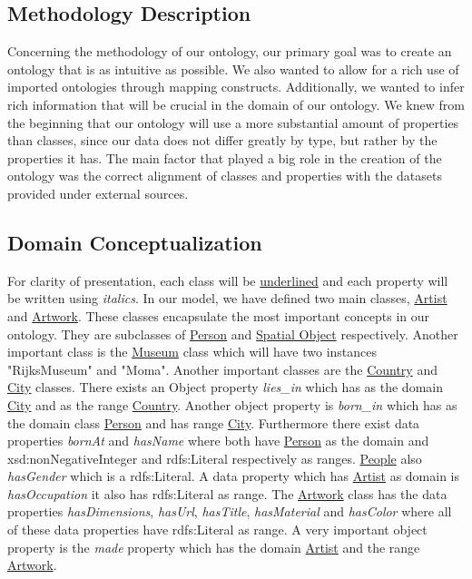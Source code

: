 \documentclass{article}
\begin{document}
\subsection{Methodology Description}


Concerning the methodology of our ontology, our primary goal was to create an ontology that is as intuitive as possible. We also wanted to allow for a rich use of imported ontologies through mapping constructs. Additionally, we wanted to infer rich information that will be crucial in the domain of our ontology. We knew from the beginning that our ontology will use a more substantial amount of properties than classes, since our data does not differ greatly by type, but rather by the properties it has. The main factor that played a big role in the creation of the ontology was the correct alignment of classes and properties with the datasets provided under external sources.

\subsection{Domain Conceptualization}
For clarity of presentation, each class will be \underline{underlined} and each property will be written using \textit{italics}. 
In our model, we have defined two main classes,  \underline{Artist} and \underline{Artwork}. These classes encapsulate the most important concepts in our ontology. They are subclasses of \underline{Person} and \underline{Spatial Object} respectively. 
Another important class is the \underline{Museum} class which will have two instances "RijksMuseum" and "Moma". Another important classes are the \underline{Country} and \underline{City} classes.  There exists an Object property \textit{lies\_in} which has as the domain \underline{City} and as the range \underline{Country}. Another object property is  \textit{born\_in} which has as the domain class \underline{Person} and has range \underline{City}. Furthermore there exist data properties  \textit{bornAt}     and \textit{hasName} where both have \underline{Person} as the domain and xsd:nonNegativeInteger and rdfs:Literal respectively as ranges.
\underline{People} also \textit{hasGender} which is a rdfs:Literal.  A data property which has \underline{Artist} as domain is \textit{hasOccupation} it also has rdfs:Literal as range. The \underline{Artwork} class has the data properties  \textit{hasDimensions}, \textit{hasUrl}, \textit{hasTitle}, \textit{hasMaterial} and \textit{hasColor} where all of these data properties have rdfs:Literal as range. A very important object property is the \textit{made} property which has the domain \underline{Artist} and the range \underline{Artwork}. 
\end{document}
